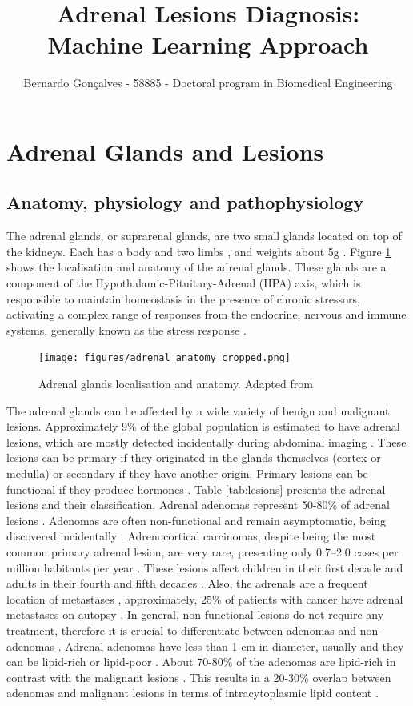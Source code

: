 \documentclass{article}
\title{Adrenal Lesions Diagnosis: Machine Learning Approach}
\author{Bernardo Gonçalves - 58885 - Doctoral program in Biomedical Engineering}
\begin{document}
\maketitle

\section{Adrenal Glands and Lesions}

\subsection{Anatomy, physiology and pathophysiology}

The adrenal glands, or suprarenal glands, are two small glands located on top of
the kidneys.  Each has a body and two limbs \cite{Baba2012}, and weights about
5g \cite{brit}. Figure \ref{fig:adrenal_ana} shows the localisation and anatomy
of the adrenal glands. These glands are a component of the
Hypothalamic-Pituitary-Adrenal (HPA) axis, which is responsible to maintain
homeostasis in the presence of chronic stressors, activating a complex range of
responses from the endocrine, nervous and immune systems, generally known as the
stress response \cite{open}.

\begin{figure}
    \centering
    \texttt{[image: figures/adrenal\_anatomy\_cropped.png]}
    \caption{Adrenal glands localisation and anatomy.  Adapted from \cite{Grossman2022}}
    \label{fig:adrenal_ana}
\end{figure}

The adrenal glands can be affected by a wide variety of benign and malignant
lesions. Approximately 9\% of the global population is estimated to have adrenal
lesions, which are mostly detected incidentally during abdominal imaging
\cite{Dhamija2015}. These lesions can be primary if they originated in the
glands themselves (cortex or medulla) or secondary if they have another origin.
Primary lesions can be functional if they produce hormones \cite{Panda2015}.
Table \ref{tab:lesions} presents the adrenal lesions and their classification.
Adrenal adenomas represent 50-80\% of adrenal lesions \cite{Bracci2022}. Adenomas
are often non-functional and remain asymptomatic, being discovered incidentally
\cite{Platzek2019}. Adrenocortical carcinomas, despite being the most common
primary adrenal lesion, are very rare, presenting only 0.7–2.0 cases per million
habitants per year \cite{Bracci2022}. These lesions affect children in their
first decade and adults in their fourth and fifth decades \cite{Panda2015}.
Also, the adrenals are a frequent location of metastases \cite{Platzek2019},
approximately, 25\% of patients with cancer have adrenal metastases on autopsy
\cite{Bracci2022}. In general, non-functional lesions do not require any
treatment, therefore it is crucial to differentiate between adenomas and
non-adenomas \cite{Platzek2019}. Adrenal adenomas have less than 1 cm in
diameter, usually and they can be lipid-rich or lipid-poor \cite{Panda2015}.
About 70-80\% of the adenomas are lipid-rich in contrast with the malignant
lesions \cite{Platzek2019}. This results in a 20-30\% overlap between adenomas
and malignant lesions in terms of intracytoplasmic lipid content
\cite{Israel2004}.
\end{document}
